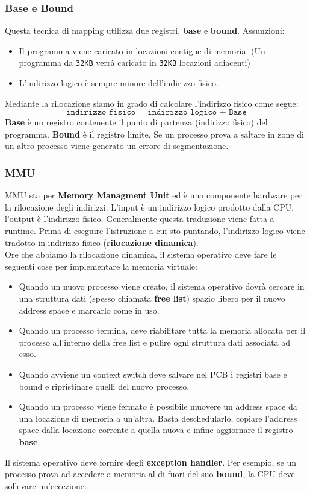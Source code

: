 \documentclass[12pt, twoside, letterpaper]{article}
\begin{document}
			\subsubsection{Base e Bound}
				Questa tecnica di mapping utilizza due registri, \textbf{base} e \textbf{bound}.
				Assunzioni: 
				\begin{itemize}
					\item Il programma viene caricato in locazioni contigue di memoria. (Un programma da \texttt{32KB} verrà caricato in \texttt{32KB} locazioni adiacenti)
					\item L'indirizzo logico è sempre minore dell'indirizzo fisico.
				\end{itemize}
				Mediante la rilocazione siamo in grado di calcolare l'indirizzo fisico come segue: 
				$$\texttt{indirizzo fisico = indirizzo logico + Base}$$
				\textbf{Base} è un registro contenente il punto di partenza (indirizzo fisico) del programma. \textbf{Bound} è il registro limite. Se un processo prova a saltare in zone di un altro processo viene generato un errore di segmentazione.
				
			\subsubsection{MMU}
				MMU sta per \textbf{Memory Managment Unit} ed è una componente hardware per la rilocazione degli indirizzi. L'input è un indirizzo logico prodotto dalla CPU, l'output è l'indirizzo fisico. Generalmente questa traduzione viene fatta a runtime. Prima di eseguire l'istruzione a cui sto puntando, l'indirizzo logico viene tradotto in indirizzo fisico (\textbf{rilocazione dinamica}).\\
				Ore che abbiamo la rilocazione dinamica, il sistema operativo deve fare le seguenti cose per implementare la memoria virtuale: 
				\begin{itemize}
					\item Quando un nuovo processo viene creato, il sistema operativo dovrà cercare in una struttura dati (spesso chiamata \textbf{free list}) spazio libero per il nuovo address space e marcarlo come in uso.
					\item Quando un processo termina, deve riabilitare tutta la memoria allocata per il processo all'interno della free list e pulire ogni struttura dati associata ad esso.
					\item Quando avviene un context switch deve salvare nel PCB i registri base e bound e ripristinare quelli del nuovo processo. 
					\item Quando un processo viene fermato è possibile muovere un address space da una locazione di memoria a un'altra. Basta deschedularlo, copiare l'address space dalla locazione corrente a quella nuova e infine aggiornare il registro \textbf{base}.
				\end{itemize}
				Il sistema operativo deve fornire degli \textbf{exception handler}. Per esempio, se un processo prova ad accedere a memoria al di fuori del suo \textbf{bound}, la CPU deve sollevare un'eccezione. 
				
\end{document}
